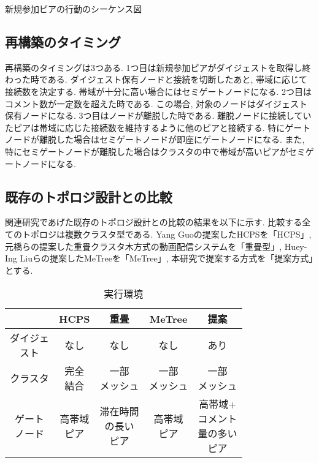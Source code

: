 新規参加ピアの行動のシーケンス図

\subsection{再構築のタイミング}
再構築のタイミングは3つある. 1つ目は新規参加ピアがダイジェストを取得し終わった時である. ダイジェスト保有ノードと接続を切断したあと, 帯域に応じて接続数を決定する. 帯域が十分に高い場合にはセミゲートノードになる. 2つ目はコメント数が一定数を超えた時である. この場合, 対象のノードはダイジェスト保有ノードになる. 3つ目はノードが離脱した時である. 離脱ノードに接続していたピアは帯域に応じた接続数を維持するように他のピアと接続する. 特にゲートノードが離脱した場合はセミゲートノードが即座にゲートノードになる. また, 特にセミゲートノードが離脱した場合はクラスタの中で帯域が高いピアがセミゲートノードになる.

\subsection{既存のトポロジ設計との比較}
関連研究であげた既存のトポロジ設計との比較の結果を以下に示す. 比較する全てのトポロジは複数クラスタ型である. Yang Guoの提案したHCPSを「HCPS」, 元橋らの提案した重畳クラスタ木方式の動画配信システムを「重畳型」, Huey-Ing Liuらの提案したMeTreeを「MeTree」, 本研究で提案する方式を「提案方式」とする.

\begin{table}[h]
  \caption{実行環境}
  \label{tbl:EvalEnv}
  \centering
      {\small
        \begin{tabular}{|c|c|c|c|c|} \hline
          & HCPS & 重畳 & MeTree & 提案 \\ \hline \hline
          \shortstack{ダイジェ \\ スト} & なし & なし & なし & あり\\ \hline
          クラスタ & \shortstack{完全 \\ 結合} & \shortstack{一部 \\ メッシュ} & \shortstack{一部 \\ メッシュ}  & \shortstack{一部 \\ メッシュ}\\
          \hline
          \shortstack{ゲート \\ ノード} & \shortstack{高帯域 \\ ピア} & \shortstack{滞在時間 \\ の長い \\ ピア} & \shortstack{高帯域 \\ ピア} & \shortstack{高帯域+ \\ コメント \\ 量の多い \\ ピア} \\
          \hline
        \end{tabular}
      }
\end{table}

